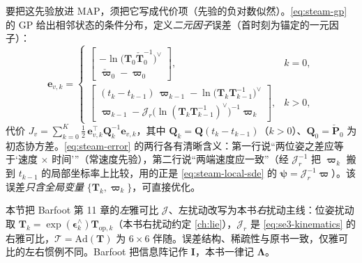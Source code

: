 要把这先验放进 MAP，须把它写成代价项（先验的负对数似然）。\cref{eq:steam-gp} 的 GP 给出相邻状态的条件分布，定义\emph{二元因子}误差（首时刻为锚定的一元因子）：
\begin{equation}
  \mathbf{e}_{v,k}=
  \begin{cases}
    \begin{bmatrix}-\ln\!\big(\mathbf{T}_0\check{\mathbf{T}}_0^{-1}\big)^\vee\\[2pt]\check{\boldsymbol{\varpi}}_0-\boldsymbol{\varpi}_0\end{bmatrix}, & k=0,\\[14pt]
    \begin{bmatrix}(t_k-t_{k-1})\,\boldsymbol{\varpi}_{k-1}-\ln\!\big(\mathbf{T}_k\mathbf{T}_{k-1}^{-1}\big)^\vee\\[4pt]
    \boldsymbol{\varpi}_{k-1}-\boldsymbol{\mathcal{J}}_r\!\big(\ln(\mathbf{T}_k\mathbf{T}_{k-1}^{-1})^\vee\big)^{-1}\boldsymbol{\varpi}_k\end{bmatrix}, & k>0,
  \end{cases}
  \label{eq:steam-error}
\end{equation}
代价 $J_v=\sum_{k=0}^{K}\tfrac12\,\mathbf{e}_{v,k}^\top\mathbf{Q}_k^{-1}\mathbf{e}_{v,k}$，其中 $\mathbf{Q}_k=\mathbf{Q}(t_k-t_{k-1})$（$k>0$）、$\mathbf{Q}_0=\check{\mathbf{P}}_0$ 为初态协方差。\cref{eq:steam-error} 的两行各有清晰含义：第一行说“两位姿之差应等于‘速度 $\times$ 时间’”（常速度先验），第二行说“两端速度应一致”（经 $\boldsymbol{\mathcal{J}}_r^{-1}$ 把 $\boldsymbol{\varpi}_k$ 搬到 $t_{k-1}$ 的局部坐标率上比较，用的正是 \cref{eq:steam-local-sde} 的 $\boldsymbol{\psi}=\boldsymbol{\mathcal{J}}_r^{-1}\boldsymbol{\varpi}$）。该误差\emph{只含全局变量} $\{\mathbf{T}_k,\boldsymbol{\varpi}_k\}$，可直接优化。

\begin{note}
本节把 Barfoot\cite{barfoot2024state} 第 11 章的\emph{左}雅可比 $\boldsymbol{\mathcal{J}}$、左扰动改写为本书\emph{右}扰动主线：位姿扰动取 $\mathbf{T}_k=\exp(\boldsymbol{\epsilon}_k^\wedge)\mathbf{T}_{\mathrm{op},k}$（本书右扰动约定 \cref{ch:lie}），$\boldsymbol{\mathcal{J}}_r$ 是 \cref{eq:se3-kinematics} 的右雅可比，$\boldsymbol{\mathcal{T}}=\mathrm{Ad}(\mathbf{T})$ 为 $6\times6$ 伴随。误差结构、稀疏性与原书一致，仅雅可比的左右惯例不同。Barfoot 把信息阵记作 $\mathbf{I}$，本书一律记 $\boldsymbol{\Lambda}$。
\end{note}

